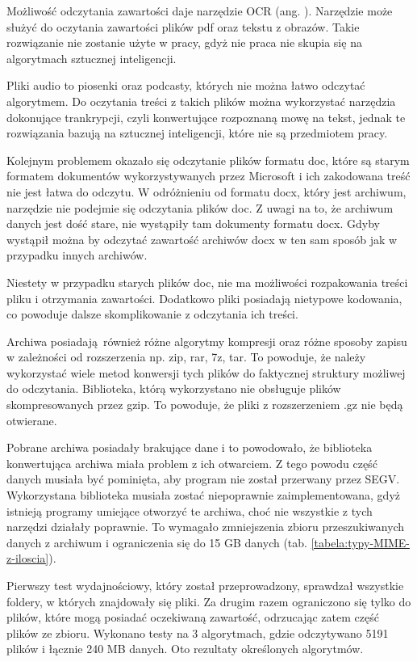 Możliwość odczytania zawartości daje narzędzie OCR (ang. ).
Narzędzie może służyć do oczytania zawartości plików pdf oraz tekstu z obrazów.
Takie rozwiązanie nie zostanie użyte w pracy, gdyż nie praca nie skupia się na 
algorytmach sztucznej inteligencji.

Pliki audio to piosenki oraz podcasty, których nie można łatwo odczytać algorytmem.
Do oczytania treści z takich plików można wykorzystać narzędzia dokonujące 
trankrypcji, czyli konwertujące rozpoznaną mowę na tekst, jednak te rozwiązania bazują 
na sztucznej inteligencji, które nie są przedmiotem pracy.

Kolejnym problemem okazało się odczytanie plików formatu doc, które są starym 
formatem dokumentów wykorzystywanych przez Microsoft i ich zakodowana treść nie
jest łatwa do odczytu. W odróżnieniu od formatu docx, który jest archiwum, 
narzędzie nie podejmie się odczytania plików doc. Z uwagi na to, że archiwum danych
jest dość stare, nie wystąpiły tam dokumenty formatu docx. Gdyby wystąpił można
by odczytać zawartość archiwów docx w ten sam sposób jak w przypadku innych 
archiwów.

Niestety w przypadku starych plików doc, nie ma możliwości rozpakowania treści
pliku i otrzymania zawartości. Dodatkowo pliki posiadają nietypowe kodowania,
co powoduje dalsze skomplikowanie z odczytania ich treści.

Archiwa posiadają również różne algorytmy kompresji oraz różne sposoby zapisu w zależności od
rozszerzenia np. zip, rar, 7z, tar. To powoduje, że należy wykorzystać wiele
metod konwersji tych plików do faktycznej struktury możliwej do odczytania. 
Biblioteka, którą wykorzystano nie obsługuje plików skompresowanych przez gzip.
To powoduje, że pliki z rozszerzeniem .gz nie będą otwierane.

Pobrane archiwa posiadały brakujące dane i to powodowało, że biblioteka konwertująca
archiwa miała problem z ich otwarciem. Z tego powodu część danych musiała być 
pominięta, aby program nie został przerwany przez SEGV. Wykorzystana biblioteka
musiała zostać niepoprawnie zaimplementowana, gdyż istnieją programy umiejące 
otworzyć te archiwa, choć nie wszystkie z tych narzędzi działały poprawnie.
To wymagało zmniejszenia zbioru przeszukiwanych danych z archiwum i ograniczenia
się do 15 GB danych (tab. \ref{tabela:typy-MIME-z-iloscia}).




Pierwszy test wydajnościowy, który został przeprowadzony, sprawdzał wszystkie 
foldery, w których znajdowały się pliki. Za drugim razem ograniczono się tylko
do plików, które mogą posiadać oczekiwaną zawartość, odrzucając zatem część 
plików ze zbioru. Wykonano testy na 3 algorytmach, gdzie odczytywano 5191 plików 
i łącznie 240 MB danych. Oto rezultaty określonych algorytmów.

